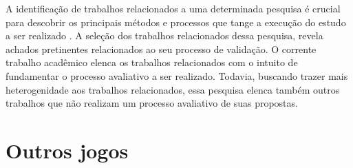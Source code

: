 


A identificação de trabalhos relacionados a uma determinada pesquisa é crucial para descobrir os principais métodos e processos que tange a execução do estudo a ser realizado \cite{wazlawick2014metodologia}. A seleção dos trabalhos relacionados dessa pesquisa, revela achados pretinentes relacionados ao seu processo de validação. O corrente trabalho acadêmico elenca os trabalhos relacionados com o intuito de fundamentar o processo avaliativo a ser realizado. Todavia, buscando trazer mais heterogenidade aos trabalhos relacionados, essa pesquisa elenca também outros trabalhos que não realizam um processo avaliativo de suas propostas. 






\section{Outros jogos}\label{sssec:outros}

